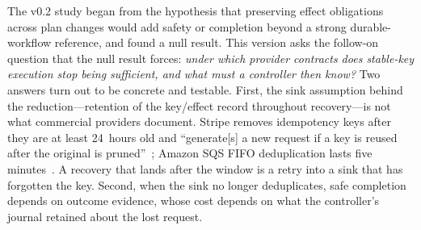 \documentclass[conference,10pt]{IEEEtran}
\begin{document}
The v0.2 study began from the hypothesis that preserving effect obligations across plan changes would add safety or completion beyond a strong durable-workflow reference, and found a null result. This version asks the follow-on question that the null result forces: \emph{under which provider contracts does stable-key execution stop being sufficient, and what must a controller then know?} Two answers turn out to be concrete and testable. First, the sink assumption behind the reduction---retention of the key/effect record throughout recovery---is not what commercial providers document. Stripe removes idempotency keys after they are at least 24~hours old and ``generate[s] a new request if a key is reused after the original is pruned''~\cite{stripe}; Amazon SQS FIFO deduplication lasts five minutes~\cite{sqsdedup}. A recovery that lands after the window is a retry into a sink that has forgotten the key. Second, when the sink no longer deduplicates, safe completion depends on outcome evidence, whose cost depends on what the controller's journal retained about the lost request.
\end{document}
